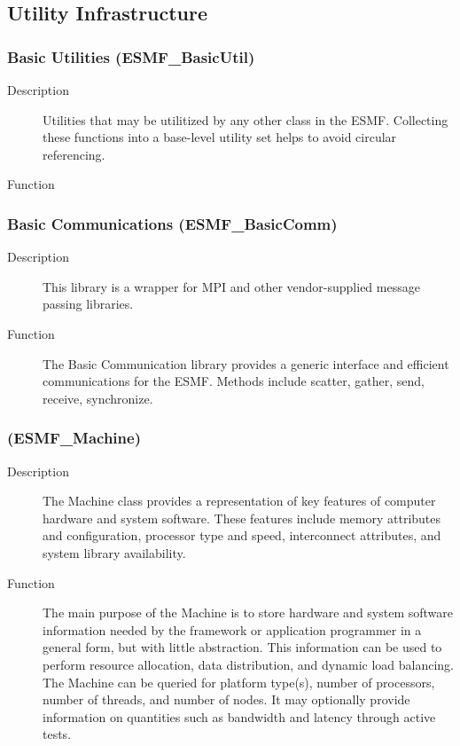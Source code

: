 \subsection{Utility Infrastructure}

\subsubsection{Basic Utilities (ESMF\_BasicUtil)} 
\begin{description}
\item [Description] Utilities that may be utilitized by any other class in the ESMF.  
Collecting these functions into a base-level utility set helps to 
avoid circular referencing.
\item [Function] 
\end{description}

\subsubsection{Basic Communications (ESMF\_BasicComm)}
\begin{description}
\item [Description] This library is a wrapper for MPI and other vendor-supplied 
message passing libraries.
\item [Function] The Basic Communication library provides a generic interface
and efficient communications for the ESMF.  Methods include scatter, gather, send,
receive, synchronize. 
\end{description}

\subsubsection{ (ESMF\_Machine)} 
\begin{description}
\item [Description] The Machine class provides a representation of 
key features of computer hardware and system software.  These
features include memory attributes and configuration, processor type and speed,
interconnect attributes, and system library availability.
\item [Function]
The main purpose of the Machine is to store hardware and system software
information needed by the framework or application programmer in a general
form, but with little abstraction.  This information can be used to perform resource 
allocation, data distribution, and dynamic load balancing.  The Machine can be queried
for platform type(s), number of processors, number of threads, and number of 
nodes.  It may optionally provide information on quantities such as bandwidth and 
latency through active tests.  
\end{description}

